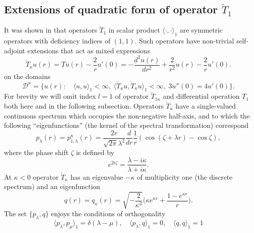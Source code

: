 \documentclass[12pt]{article}
\newcommand{\DD}{\mathcal{D}}
\begin{document}
\subsection{Extensions of quadratic form of operator $ \check{T}_{1} $}
	It was shown in
\cite{Inv}
	that operators
$ \check{T}_{1} $
	in scalar product
$ \langle \cdot , \cdot \rangle_{1} $
	are symmetric operators with deficiency indices of
$ (1,1) $.
	Such operators have non-trivial self-adjoint extensions
	that act as mixed expressions
\begin{equation*}
    \check{T}_{\kappa} u(r) = T u(r) - \frac{2}{r} u'(0)
    = -\frac{d^{2}u(r)}{dr^{2}} + \frac{2}{r^{2}} u(r) -\frac{2}{r}u'(0) .
\end{equation*}
	on the domains
\begin{equation}
\label{cTb}
    \DD^{\kappa} = \{u(r): \quad \langle u,u\rangle_{1} < \infty, \;
	\langle \check{T}_{\kappa} u, \check{T}_{\kappa} u\rangle_{1} <\infty,
	\; 3u''(0) = 4u'(0) \} .
\end{equation}
	For brevity we will omit index
$ l=1 $
	of operator
$ \check{T}_{1\kappa} $
	and differential operation
$ T_{1} $
	both here and in the following subsection.
	Operators
$ \check{T}_{\kappa} $
have a single-valued continuous spectrum which occupies the non-negative
    half-axis, and to which the following ``eigenfunctions'' (the kernel
    of the spectral transformation) correspond
\begin{equation*}
\label{Tpl}
    p_{\lambda}(r) = p_{1,\lambda}^{\kappa}(r)
        = \frac{2r}{\sqrt{2\pi}\lambda^{2}} \frac{d}{dr}\frac{1}{r}
    (\cos(\zeta +\lambda r) - \cos\zeta) ,
\end{equation*}
	where the phase shift
$ \zeta $
    is defined by
\begin{equation*}
    e^{2i\zeta} = \frac{\lambda - i\kappa}{\lambda + i\kappa}.
\end{equation*}
	At
$ \kappa < 0 $
	operator
$ \check{T}_{\kappa} $
	has an eigenvalue
$ -\kappa $
    of multiplicity one
	(the discrete spectrum) and an eigenfunction
\begin{equation*}
    q(r) = q_{\kappa}(r)
    = \sqrt{-\frac{2}{\kappa^{3}}}
        \bigl(\kappa e^{\kappa r} + \frac{1-e^{\kappa r}}{r}\bigr) .
\end{equation*}
	The set
$ \{p_{\lambda}, q \} $
	enjoys the conditions of orthogonality
\begin{equation*}
    \langle p_{\lambda} , p_{\mu} \rangle_{1} = \delta(\lambda-\mu) ,
    \quad \langle p_{\lambda} , q \rangle_{1} = 0 ,
    \quad \langle q , q \rangle_{1} = 1
\end{equation*}
\end{document}

